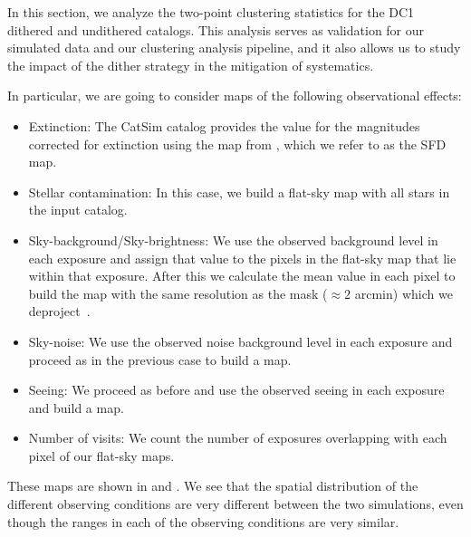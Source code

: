 \documentclass[\docopts]{\docclass}
\begin{document}
In this section, we analyze the two-point clustering statistics for the DC1 dithered and undithered catalogs. This analysis serves as validation for our simulated data and our clustering analysis pipeline, and it also allows us to study the impact of the dither strategy in the mitigation of systematics.

In particular, we are going to consider maps of the following observational effects:
\begin{itemize}
\item Extinction: The CatSim catalog provides the value for the magnitudes corrected for extinction using the map from \citet{1998ApJ...500..525S}, which we refer to as the SFD map.
\item Stellar contamination: In this case, we build a flat-sky map with all stars in the input catalog.
\item Sky-background/Sky-brightness: We use the observed background level in each exposure and assign that value to the pixels in the flat-sky map that lie within that exposure. After this we calculate the mean value in each pixel to build the map with the same resolution as the mask ($\approx 2$ arcmin) which we deproject~\citep{2019MNRAS.484.4127A}. 
\item Sky-noise: We use the observed noise background level in each exposure and proceed as in the previous case to build a map.
\item Seeing: We proceed as before and use the observed seeing in each exposure and build a map.
\item Number of visits: We count the number of exposures overlapping with each pixel of our flat-sky maps.
\end{itemize}
These maps are shown in  and . We see that the spatial distribution of the different observing conditions are very different between the two simulations, even though the ranges in each of the observing conditions are very similar. 
\end{document}
